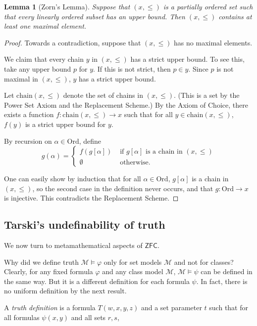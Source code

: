 \documentclass[a4paper, 11pt]{amsart}
\newtheorem{lemma}[lemma]{Lemma}
\theoremstyle{remark}
\newcommand{\axiomft}[1]{\mathsf{#1}}
\newcommand{\ZFC}{\axiomft{ZFC}}
\newcommand{\Ord}{\mathrm{Ord}}
\newcommand{\cM}{\mathcal M}
\begin{document}
\begin{lemma}[Zorn's Lemma] 
Suppose that $(x,\leq)$ is a partially ordered set such that every linearly ordered subset has an upper bound. 
Then $(x,\leq)$ contains at least one maximal element. 
\end{lemma} 
\begin{proof} 
Towards a contradiction, suppose that $(x,\leq)$ has no maximal elements. 

We claim that every chain $y$ in $(x,\leq)$ has a strict upper bound. 
To see this, take any upper bound $p$ for $y$. 
If this is not strict, then $p\in y$. 
Since $p$ is not maximal in $(x,\leq)$, $y$ has a strict upper bound. 

Let $\mathrm{chain}(x,\leq)$ denote the set of chains in $(x,\leq)$. (This is a set by the Power Set Axiom and the Replacement Scheme.) 
By the Axiom of Choice, there exists a function 
$ f\colon \mathrm{chain}(x,\leq) \rightarrow x $ 
such that for all $y\in \mathrm{chain}(x,\leq)$, $f(y)$ is a strict upper bound for $y$. 

By recursion on $\alpha\in \Ord$, define 
$$ g(\alpha) = \begin{cases}
      f(g[\alpha])  & \text{ if } g[\alpha] \text{ is a chain in } (x,\leq)  \\
      \emptyset & \text{ otherwise.}  
    \end{cases}$$ 

One can easily show by induction that for all $\alpha\in\Ord$, $g[\alpha]$ is a chain in $(x,\leq)$, so the second case in the definition never occurs, and that $g\colon \Ord\rightarrow x$ is injective. 
This contradicts the Replacement Scheme. 
\end{proof} 



\subsection{Tarski's undefinability of truth} 


We now turn to metamathematical aspects of $\ZFC$. 

Why did we define truth $\cM\models \varphi$ only for set models $\cM$ and not for classes? 
Clearly, for any fixed formula $\varphi$ and any class model $\cM$, $\cM\models \psi$ can be defined in the same way. 
But it is a different definition for each formula $\psi$. 
In fact, there is no uniform definition by the next result. 

A \emph{truth definition} is a formula $T(w,x,y,z)$ and a set parameter $t$ such that for all formulas $\psi(x,y)$ and all sets $r,s$, 
\end{document}

